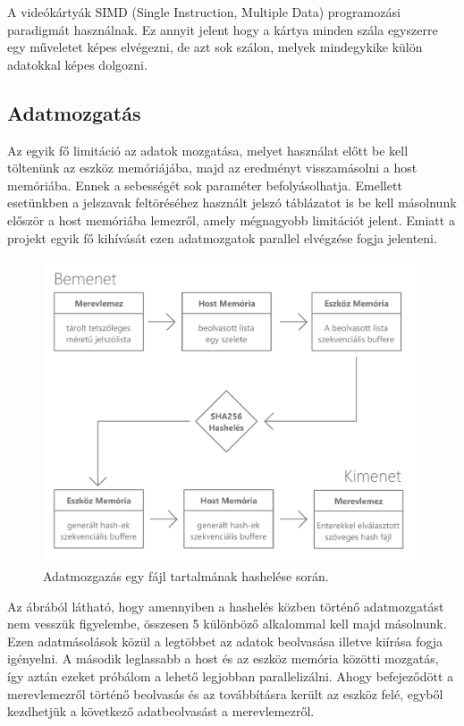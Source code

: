 A videókártyák SIMD (Single Instruction, Multiple Data) programozási paradigmát használnak. Ez annyit jelent hogy a kártya minden szála egyszerre egy műveletet képes elvégezni, de azt sok szálon, melyek mindegykike külön adatokkal képes dolgozni.



\subsection{Adatmozgatás}

Az egyik fő limitáció az adatok mozgatása, melyet használat előtt be kell töltenünk az eszköz memóriájába, majd az eredményt visszamásolni a host memóriába. Ennek a sebességét sok paraméter befolyásolhatja. Emellett esetünkben a jelszavak feltöréséhez használt jelszó táblázatot is be kell másolnunk először a host memóriába lemezről, amely mégnagyobb limitációt jelent. Emiatt a projekt egyik fő kihívását ezen adatmozgatok parallel elvégzése fogja jelenteni.


\begin{figure}[H]
    \centering 
    \includegraphics[width=\textwidth]{images/pdf/data-movement.pdf}
    \caption{Adatmozgazás egy fájl tartalmának hashelése során.}
    \label{fig:lineargpu}
\end{figure}


Az ábrából látható, hogy amennyiben a hashelés közben történő adatmozgatást nem vesszük figyelembe, összesen 5 különböző alkalommal kell majd másolnunk. Ezen adatmásolások közül a legtöbbet az adatok beolvasása illetve kiírása fogja igényelni. A második leglassabb a host és az eszköz memória közötti mozgatás, így aztán ezeket próbálom a lehető legjobban parallelizálni. Ahogy befejeződött a merevlemezről történő beolvasás és az továbbításra került az eszköz felé, egyből kezdhetjük a következő adatbeolvasást a merevlemezről.



